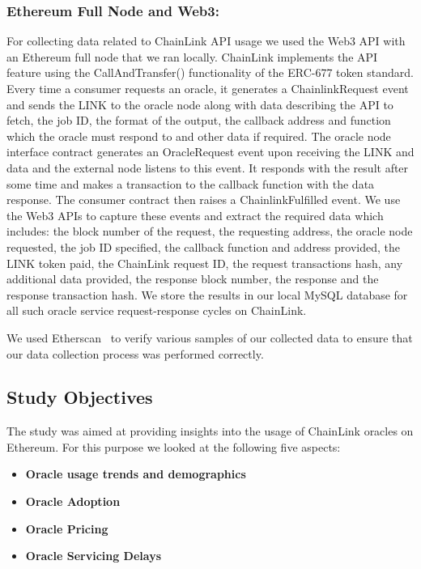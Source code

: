 \documentclass[runningheads]{llncs}
\begin{document}
\subsubsection{Ethereum Full Node and Web3:}
For collecting data related to ChainLink API usage we used the Web3 API with an Ethereum full node that we ran locally. ChainLink implements the API feature using the CallAndTransfer() functionality of the ERC-677 token standard. Every time a consumer requests an oracle, it generates a ChainlinkRequest event and sends the LINK to the oracle node along with data describing the API to fetch, the job ID, the format of the output, the callback address and function which the oracle must respond to and other data if required. The oracle node interface contract generates an OracleRequest event upon receiving the LINK and data and the external node listens to this event. It responds with the result after some time and makes a transaction to the callback function with the data response. The consumer contract then raises a ChainlinkFulfilled event. We use the Web3 APIs to capture these events and extract the required data which includes: the block number of the request, the requesting address, the oracle node requested, the job ID specified, the callback function and address provided, the LINK token paid, the ChainLink request ID, the request transactions hash, any additional data provided, the response block number, the response and the response transaction hash. We store the results in our local MySQL database for all such oracle service request-response cycles on ChainLink.

We used Etherscan~\cite{team2017etherscan} to verify various samples of our collected data to ensure that our data collection process was performed correctly. 

\subsection{Study Objectives}
The study was aimed at providing insights into the usage of ChainLink oracles on Ethereum. For this purpose we looked at the following five aspects:
\begin{itemize}
\item \textbf{Oracle usage trends and demographics}
\item \textbf{Oracle Adoption}
\item \textbf{Oracle Pricing}
\item \textbf{Oracle Servicing Delays}
\end{itemize}
\end{document}
